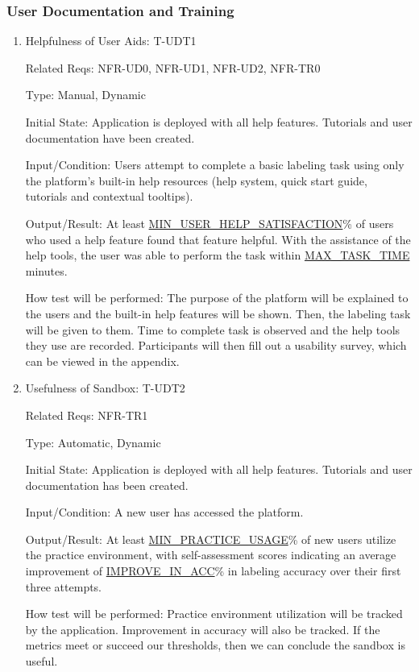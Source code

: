 \documentclass[12pt, titlepage]{article}
\begin{document}
\subsubsection{User Documentation and Training}

\begin{enumerate}

\item{Helpfulness of User Aids: T-UDT1\\}

Related Reqs: NFR-UD0, NFR-UD1, NFR-UD2, NFR-TR0

Type: Manual, Dynamic
					
Initial State: Application is deployed with all help features. Tutorials and user documentation have been created.
					
Input/Condition: Users attempt to complete a basic labeling task using only the platform’s built-in help resources (help system, quick start guide, tutorials and contextual tooltips).
					
Output/Result: At least \hyperref[MIN_USER_HELP_SATISFACTION]{MIN\_USER\_HELP\_SATISFACTION}\% of users who used a help feature found that feature helpful. With the assistance of the help tools, the user was able to perform the task within \hyperref[MAX_TASK_TIME]{MAX\_TASK\_TIME} minutes.
					
How test will be performed: The purpose of the platform will be explained to the users and the built-in help features will be shown. Then, the labeling task will be given to them. Time to complete task is observed and the help tools they use are recorded. Participants will then fill out a usability survey, which can be viewed in the appendix.

\item{Usefulness of Sandbox: T-UDT2\\}

Related Reqs: NFR-TR1

Type: Automatic, Dynamic
					
Initial State: Application is deployed with all help features. Tutorials and user documentation has been created.
					
Input/Condition: A new user has accessed the platform.
					
Output/Result: At least \hyperref[MIN_PRACTICE_USAGE]{MIN\_PRACTICE\_USAGE}\% of new users utilize the practice environment, with self-assessment scores indicating an average improvement of \hyperref[IMPROVE_IN_ACC]{IMPROVE\_IN\_ACC}\% in labeling accuracy over their first three attempts.
					
How test will be performed: Practice environment utilization will be tracked by the application. Improvement in accuracy will also be tracked. If the metrics meet or succeed our thresholds, then we can conclude the sandbox is useful.
\end{enumerate}
\end{document}
